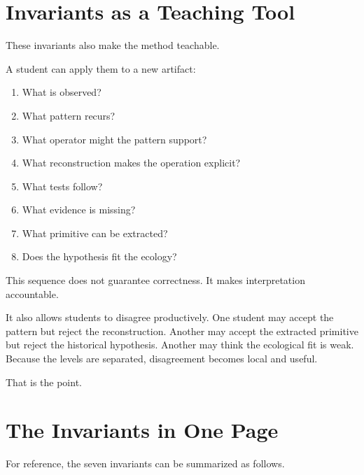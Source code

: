 \documentclass[11pt]{book}
\begin{document}
\section{Invariants as a Teaching Tool}

These invariants also make the method teachable.

A student can apply them to a new artifact:

\begin{enumerate}[label=\arabic*.]
    \item What is observed?
    \item What pattern recurs?
    \item What operator might the pattern support?
    \item What reconstruction makes the operation explicit?
    \item What tests follow?
    \item What evidence is missing?
    \item What primitive can be extracted?
    \item Does the hypothesis fit the ecology?
\end{enumerate}

This sequence does not guarantee correctness. It makes interpretation accountable.

It also allows students to disagree productively. One student may accept the pattern but reject the reconstruction. Another may accept the extracted primitive but reject the historical hypothesis. Another may think the ecological fit is weak. Because the levels are separated, disagreement becomes local and useful.

That is the point.

\section{The Invariants in One Page}

For reference, the seven invariants can be summarized as follows.
\end{document}
